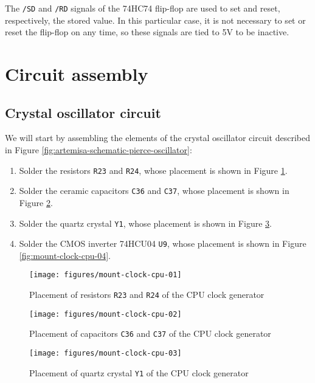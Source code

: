 The {\tt /SD} and {\tt /RD} signals of the 74HC74 flip-flop are used to set and reset, respectively, the stored value. In this particular case, it is not necessary to set or reset the flip-flop on any time, so these signals are tied to 5V to be inactive.

\section{Circuit assembly}

\subsection{Crystal oscillator circuit}

We will start by assembling the elements of the crystal oscillator circuit described in Figure \ref{fig:artemisa-schematic-pierce-oscillator}: 

\begin{enumerate}
  \item Solder the resistors {\tt R23} and {\tt R24}, whose placement is shown in Figure \ref{fig:mount-clock-cpu-01}.
  \item Solder the ceramic capacitors {\tt C36} and {\tt C37}, whose placement is shown in Figure \ref{fig:mount-clock-cpu-02}.
  \item Solder the quartz crystal {\tt Y1}, whose placement is shown in Figure \ref{fig:mount-clock-cpu-03}.
  \item Solder the CMOS inverter 74HCU04 {\tt U9}, whose placement is shown in Figure \ref{fig:mount-clock-cpu-04}.
\end{enumerate}


\begin{figure}[htbp]
  \centering
  \texttt{[image: figures/mount-clock-cpu-01]}
  \caption{Placement of resistors {\tt R23} and {\tt R24} of the CPU clock generator}
  \label{fig:mount-clock-cpu-01}
\end{figure}

\begin{figure}[htbp]
  \centering
  \texttt{[image: figures/mount-clock-cpu-02]}
  \caption{Placement of capacitors {\tt C36} and {\tt C37} of the CPU clock generator}
  \label{fig:mount-clock-cpu-02}
\end{figure}

\begin{figure}[htbp]
  \centering
  \texttt{[image: figures/mount-clock-cpu-03]}
  \caption{Placement of quartz crystal {\tt Y1}  of the CPU clock generator}
  \label{fig:mount-clock-cpu-03}
\end{figure}

